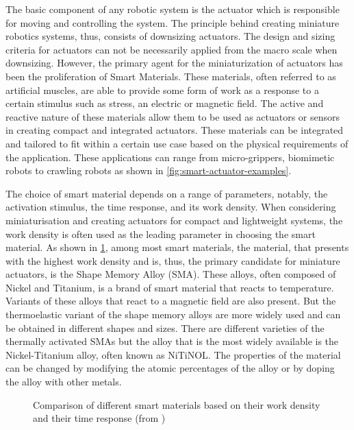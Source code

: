 The basic component of any robotic system is the actuator which is responsible for moving and controlling the system. The principle behind creating miniature robotics systems, thus, consists of downsizing actuators. The design and sizing criteria for actuators can not be necessarily applied from the macro scale when downsizing. However, the primary agent for the miniaturization of actuators has been the proliferation of Smart Materials. These materials, often referred to as artificial muscles, are able to provide some form of work as a response to a certain stimulus such as stress, an electric or magnetic field. The active and reactive nature of these materials allow them to be used as actuators or sensors in creating compact and integrated actuators. These materials can be integrated and tailored to fit within a certain use case based on the physical requirements of the application. These applications can range from micro-grippers, biomimetic robots to crawling robots as shown in \cref{fig:smart-actuator-examples}.

The choice of smart material depends on a range of parameters, notably, the activation stimulus, the time response, and its work density. When considering miniaturisation and creating actuators for compact and lightweight systems, the work density is often used as the leading parameter in choosing the smart material. As shown in \cref{fig:smart-material-comparison}, among most smart materials, the material, that presents with the highest work density and is, thus, the primary candidate for miniature actuators, is the Shape Memory Alloy (SMA). These alloys, often composed of Nickel and Titanium, is a brand of smart material that reacts to temperature. Variants of these alloys that react to a magnetic field are also present. But the thermoelastic variant of the shape memory alloys are more widely used and can be obtained in different shapes and sizes. There are different varieties of the thermally activated SMAs but the alloy that is the most widely available is the Nickel-Titanium alloy, often known as NiTiNOL. The properties of the material can be changed by modifying the atomic percentages of the alloy or by doping the alloy with other metals.

\begin{figure}[ht] %
  \centering
  \resizebox{0.8\textwidth}{!}{}
  \caption[Comparison of different smart materials based on their work density and their time response]{Comparison of different smart materials based on their work density and their time response (from \cite{preumontMechatronicsDynamicsElectromechanical2006})}
  \label{fig:smart-material-comparison}
\end{figure}

